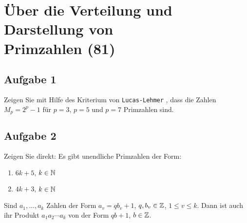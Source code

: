 \section[Über die Verteilung und Darstellung von Primzahlen (81)]
 {Über die Verteilung und Darstellung von\\Primzahlen (81)}

\subsection{Aufgabe 1}
Zeigen Sie mit Hilfe des Kriterium von \texttt{Lucas-Lehmer}
\parencite[78]{book:zahlentheorie},
dass die Zahlen $M_p = 2^p - 1$ für $p = 3$, $p = 5$ und
$p = 7$ Primzahlen sind.

\subsection{Aufgabe 2}
Zeigen Sie direkt: Es gibt unendliche Primzahlen der Form:
\begin{enumerate}[label=\alph*)]
  \item $6k + 5$, $k \in \mathbb{N}$
  \item $4k + 3$, $k \in \mathbb{N}$
\end{enumerate}

\begin{lemma}
  Sind $a_1,\dotsc,a_k$ Zahlen der Form $a_v = qb_v + 1$, $q,b_v \in \mathbb{Z}$,
  $1 \leq v \leq k$. Dann ist auch ihr Produkt $a_1a_2 \dotsm a_k$ von
  der Form $qb + 1$, $b \in \mathbb{Z}$.
\end{lemma}

